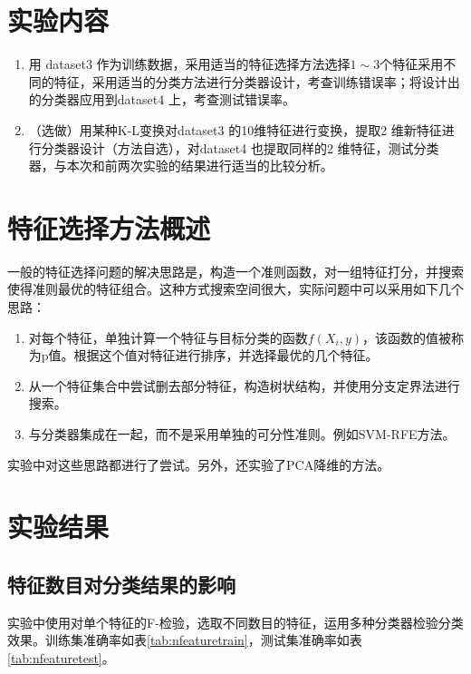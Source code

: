 \tableofcontents
\clearpage


\section{实验内容}
	\begin{enumerate}
	\item 用 {\ttfamily dataset3} 作为训练数据，采用适当的特征选择方法选择$1\sim3$个特征采用不同的特征，采用适当的分类方法进行分类器设计，考查训练错误率；将设计出的分类器应用到{\ttfamily dataset4} 上，考查测试错误率。
	\item （选做）用某种K-L变换对{\ttfamily dataset3} 的10维特征进行变换，提取2 维新特征进行分类器设计（方法自选），对{\ttfamily dataset4} 也提取同样的2 维特征，测试分类器，与本次和前两次实验的结果进行适当的比较分析。
	\end{enumerate}

\section{特征选择方法概述}
一般的特征选择问题的解决思路是，构造一个准则函数，对一组特征打分，并搜索使得准则最优的特征组合。这种方式搜索空间很大，实际问题中可以采用如下几个思路：
\begin{enumerate}
\item 对每个特征，单独计算一个特征与目标分类的函数$f(X_i, y)$，该函数的值被称为p值。根据这个值对特征进行排序，并选择最优的几个特征。
\item 从一个特征集合中尝试删去部分特征，构造树状结构，并使用分支定界法进行搜索。
\item 与分类器集成在一起，而不是采用单独的可分性准则。例如{\ttfamily SVM-RFE}方法。
\end{enumerate}
实验中对这些思路都进行了尝试。另外，还实验了{\ttfamily PCA}降维的方法。

\section{实验结果}
	\subsection{特征数目对分类结果的影响}
	实验中使用对单个特征的F-检验，选取不同数目的特征，运用多种分类器检验分类效果。训练集准确率如表\ref{tab:nfeaturetrain}，测试集准确率如表\ref{tab:nfeaturetest}。


